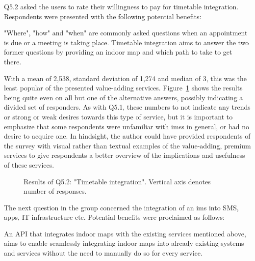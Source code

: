Q5.2 asked the users to rate their willingness to pay for timetable integration. Respondents were presented with the following potential benefits:

\begin{displayquote}
"Where", "how" and "when" are commonly asked questions when an appointment is due or a meeting is taking place. Timetable integration aims to answer the two former questions by providing an indoor map and which path to take to get there.
\end{displayquote}

With a mean of 2,538, standard deviation of 1,274 and median of 3, this was the least popular of the presented value-adding services. Figure~\ref{fig:q52} shows the results being quite even on all but one of the alternative answers, possibly indicating a divided set of responders. As with Q5.1, these numbers to not indicate any trends or strong or weak desires towards this type of service, but it is important to emphasize that some respondents were unfamiliar with \glspl{ims} in general, or had no desire to acquire one. In hindsight, the author could have provided respondents of the survey with visual rather than textual examples of the value-adding, premium services to give respondents a better overview of the implications and usefulness of these services. 


\begin{figure}[H]
    \centering
    \caption{Results of Q5.2: "Timetable integration". Vertical axis denotes number of responses.}
    \label{fig:q52}
\end{figure}


The next question in the group concerned the integration of an \gls{ims} into SMS, apps, IT-infrastructure etc. Potential benefits were proclaimed as follows:

\begin{displayquote}
An API that integrates indoor maps with the existing services mentioned above, aims to enable seamlessly integrating indoor maps into already existing systems and services without the need to manually do so for every service.
\end{displayquote}

